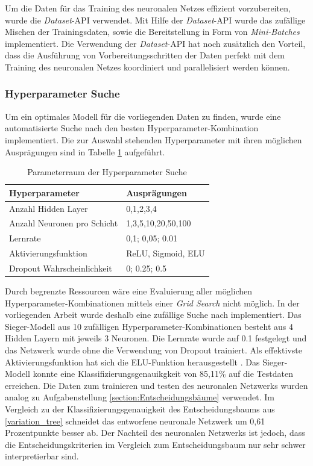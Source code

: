 Um die Daten für das Training des neuronalen Netzes effizient vorzubereiten, wurde die \emph{Dataset}-API verwendet. Mit Hilfe der \emph{Dataset}-API wurde das zufällige Mischen der Trainingsdaten, sowie die Bereitstellung in Form von \emph{Mini-Batches} implementiert. Die Verwendung der \emph{Dataset}-API hat noch zusätzlich den Vorteil, dass die Ausführung von Vorbereitungsschritten der Daten perfekt mit dem Training des neuronalen Netzes koordiniert und parallelisiert werden können.

\subsubsection{Hyperparameter Suche}
\label{nn_hyperparams}
Um ein optimales Modell für die vorliegenden Daten zu finden, wurde eine automatisierte Suche nach den besten Hyperparameter-Kombination implementiert. Die zur Auswahl stehenden Hyperparameter mit ihren möglichen Ausprägungen sind in Tabelle \ref{table:hyper} aufgeführt.

\begin{table}[ht]
	\centering
	\begin{tabular}{ll}
		\textbf{Hyperparameter}     & \textbf{Ausprägungen} \\ \hline
		Anzahl Hidden Layer         & 0,1,2,3,4             \\
		Anzahl Neuronen pro Schicht & 1,3,5,10,20,50,100    \\
		Lernrate                    & 0,1;  0,05;  0.01     \\
		Aktivierungsfunktion        & ReLU, Sigmoid, ELU \\
		Dropout Wahrscheinlichkeit  & 0;  0.25;  0.5       
	\end{tabular}
	\caption{\label{table:hyper} Parameterraum der Hyperparameter Suche}
\end{table}

Durch begrenzte Ressourcen wäre eine Evaluierung aller möglichen Hyperparameter-Kombinationen mittels einer \emph{Grid Search} nicht möglich. In der vorliegenden Arbeit wurde deshalb eine zufällige Suche nach \cite{randomSearch} implementiert. Das Sieger-Modell aus 10 zufälligen Hyperparameter-Kombinationen besteht aus 4 Hidden Layern mit jeweils 3 Neuronen. Die Lernrate wurde auf 0.1 festgelegt und das Netzwerk wurde ohne die Verwendung von Dropout trainiert. Als effektivste Aktivierungsfunktion hat sich die ELU-Funktion herausgestellt \cite{elu}. Das Sieger-Modell konnte eine Klassifizierungsgenauikgkeit von 85,11\% auf die Testdaten erreichen. Die Daten zum trainieren und testen des neuronalen Netzwerks wurden analog zu Aufgabenstellung \ref{section:Entscheidungsbäume} verwendet. Im Vergleich zu der Klassifizierungsgenauigkeit des Entscheidungsbaums aus \ref{variation_tree} schneidet das entworfene neuronale Netzwerk um 0,61 Prozentpunkte besser ab. Der Nachteil des neuronalen Netzwerks ist jedoch, dass die Entscheidungskriterien im Vergleich zum Entscheidungsbaum nur sehr schwer interpretierbar sind.
